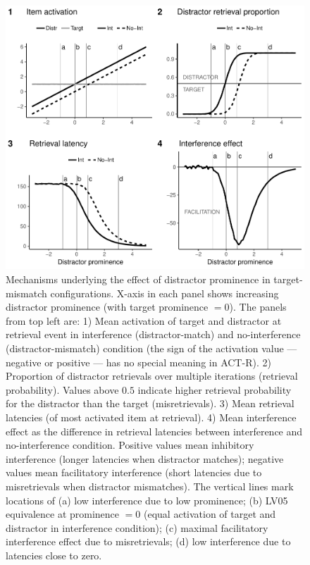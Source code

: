 \documentclass{cambridge7A}\usepackage[]{graphicx}\usepackage[]{color}
\begin{document}
\begin{subappendices}
\begin{figure}[!htbp]
\centering
%
\includegraphics[width=\textwidth]{figures/ensemble-lines-mismatch}
%
 \caption{Mechanisms underlying the effect of distractor prominence in target-mismatch configurations. 
 	X-axis in each panel shows increasing distractor prominence (with target prominence $=0$).
 	The panels from top left are:
 		1) Mean activation of target and distractor at retrieval event in interference (distractor-match) and no-interference (distractor-mismatch) condition (the sign of the activation value --- negative or positive --- has no special meaning in ACT-R).
 		2) Proportion of distractor retrievals over multiple iterations (retrieval probability). Values above $0.5$ indicate higher retrieval probability for the distractor than the target (misretrievals).
 		3) Mean retrieval latencies (of most activated item at retrieval).
 		4) Mean interference effect as the difference in retrieval latencies between interference and no-interference condition. Positive values mean inhibitory interference (longer latencies when distractor matches); negative values mean facilitatory interference (short latencies due to misretrievals when distractor mismatches).
 	The vertical lines mark locations of 
 		(a) low interference due to low prominence;
 		(b) LV05 equivalence at prominence $=0$ (equal activation of target and distractor in interference condition);
 		(c) maximal facilitatory interference effect due to misretrievals;
 		(d) low interference due to latencies close to zero.
 		}
 \label{fig:promEnsMismatch} 
\end{figure}



\end{subappendices}
\end{document}
